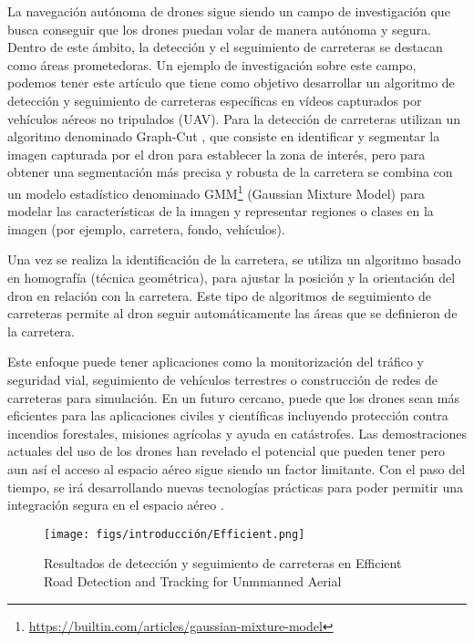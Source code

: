La navegación autónoma de drones sigue siendo un campo de investigación que busca conseguir que los drones puedan volar de manera autónoma y segura.
Dentro de este ámbito, la detección y el seguimiento de carreteras se destacan como áreas prometedoras. Un ejemplo de investigación sobre este campo, podemos 
tener este artículo \cite{article} que tiene como objetivo desarrollar un algoritmo de detección 
y seguimiento de carreteras específicas en vídeos capturados por vehículos aéreos no tripulados (UAV). Para la detección de carreteras utilizan 
un algoritmo denominado Graph-Cut \cite{sciencedirect2024graphcut}, 
que consiste en identificar y segmentar la imagen capturada por el dron para establecer la zona de interés, pero para obtener una segmentación más precisa y robusta de la carretera 
se combina con un modelo estadístico denominado GMM\footnote{\url{https://builtin.com/articles/gaussian-mixture-model}} (Gaussian Mixture Model) para modelar las características de la imagen y 
representar regiones o clases
en la imagen (por ejemplo, carretera, fondo, vehículos).

Una vez se realiza la identificación de la carretera, se utiliza un algoritmo basado en homografía (técnica geométrica), para ajustar la posición y la orientación del dron
en relación con la carretera. Este tipo de algoritmos de seguimiento de carreteras permite al dron seguir automáticamente las áreas que se definieron de la carretera. 

Este enfoque puede tener aplicaciones como la monitorización del tráfico y seguridad vial, seguimiento de vehículos terrestres o construcción de redes de carreteras para simulación. 
En un futuro cercano, puede que los drones sean más eficientes para las aplicaciones civiles y científicas incluyendo protección contra incendios forestales, misiones agrícolas y 
ayuda en catástrofes. 
Las demostraciones actuales del uso de los drones han revelado el potencial que pueden tener pero aun así el acceso al espacio aéreo sigue siendo un factor limitante. Con el paso del 
tiempo, se irá desarrollando nuevas tecnologías prácticas para poder permitir una integración segura en el espacio aéreo \cite{KrejciGarzon_2014}. 

\begin{figure} [H]
  \begin{center}
    \texttt{[image: figs/introducción/Efficient.png]}
  \end{center}
  \caption{Resultados de detección y seguimiento de carreteras en Efficient Road Detection and Tracking for Unmmanned Aerial \cite{article}}
  \label{fig:Efficient}
  \vspace{-1.5em}
\end{figure}

